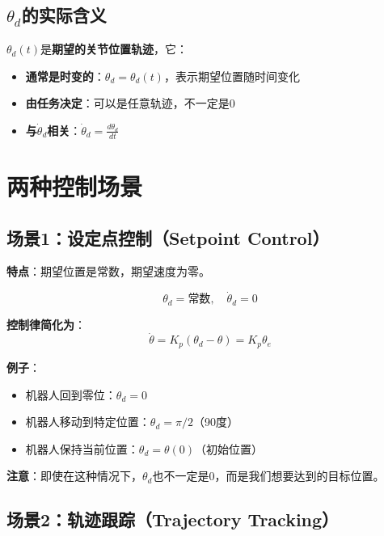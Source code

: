 \documentclass[12pt,a4paper]{article}
\begin{document}
\subsection{$\theta_d$的实际含义}

$\theta_d(t)$是\textbf{期望的关节位置轨迹}，它：

\begin{itemize}
\item \textbf{通常是时变的}：$\theta_d = \theta_d(t)$，表示期望位置随时间变化
\item \textbf{由任务决定}：可以是任意轨迹，不一定是0
\item \textbf{与$\dot{\theta}_d$相关}：$\dot{\theta}_d = \frac{d\theta_d}{dt}$
\end{itemize}

\section{两种控制场景}

\subsection{场景1：设定点控制（Setpoint Control）}

\textbf{特点}：期望位置是常数，期望速度为零。

\begin{equation}
\theta_d = \text{常数}, \quad \dot{\theta}_d = 0
\end{equation}

\textbf{控制律简化为}：
\begin{equation}
\dot{\theta} = K_p(\theta_d - \theta) = K_p \theta_e
\end{equation}

\textbf{例子}：
\begin{itemize}
\item 机器人回到零位：$\theta_d = 0$
\item 机器人移动到特定位置：$\theta_d = \pi/2$（90度）
\item 机器人保持当前位置：$\theta_d = \theta(0)$（初始位置）
\end{itemize}

\textbf{注意}：即使在这种情况下，$\theta_d$也不一定是0，而是我们想要达到的目标位置。

\subsection{场景2：轨迹跟踪（Trajectory Tracking）}
\end{document}
